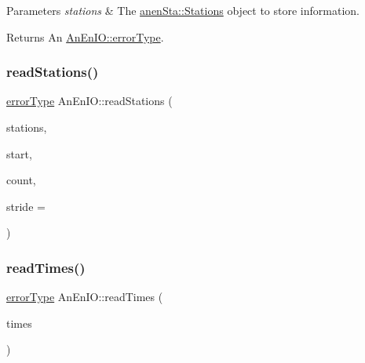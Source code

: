 \begin{DoxyParams}{Parameters}
{\em stations} & The \mbox{\hyperlink{classanen_sta_1_1_stations}{anen\+Sta\+::\+Stations}} object to store information. \\
\hline
\end{DoxyParams}
\begin{DoxyReturn}{Returns}
An \mbox{\hyperlink{class_an_en_i_o_aa56bc1ec6610b86db4349bce20f9ead0}{An\+En\+I\+O\+::error\+Type}}. 
\end{DoxyReturn}
\mbox{\label{class_an_en_i_o_ad0f7a1db44e12f42d4602898c0f51faa}} 
\subsubsection{\texorpdfstring{read\+Stations()}{readStations()}\hspace{0.1cm}{\footnotesize\ttfamily [2/2]}}
{\footnotesize\ttfamily \mbox{\hyperlink{class_an_en_i_o_aa56bc1ec6610b86db4349bce20f9ead0}{error\+Type}} An\+En\+I\+O\+::read\+Stations (\begin{DoxyParamCaption}\item[{\mbox{\hyperlink{classanen_sta_1_1_stations}{anen\+Sta\+::\+Stations}} \&}]{stations,  }\item[{size\+\_\+t}]{start,  }\item[{size\+\_\+t}]{count,  }\item[{ptrdiff\+\_\+t}]{stride = {} }\end{DoxyParamCaption})}

\mbox{\label{class_an_en_i_o_a19b454b0a9ecb5ecbc2cc2a9c139770b}} 
\subsubsection{\texorpdfstring{read\+Times()}{readTimes()}\hspace{0.1cm}{\footnotesize\ttfamily [1/2]}}
{\footnotesize\ttfamily \mbox{\hyperlink{class_an_en_i_o_aa56bc1ec6610b86db4349bce20f9ead0}{error\+Type}} An\+En\+I\+O\+::read\+Times (\begin{DoxyParamCaption}\item[{\mbox{\hyperlink{classanen_time_1_1_times}{anen\+Time\+::\+Times}} \&}]{times }\end{DoxyParamCaption})}

